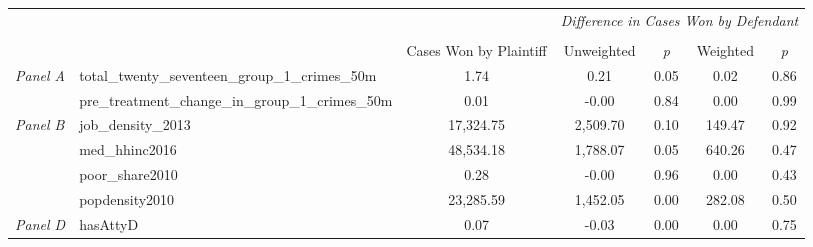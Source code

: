 \begin{tabular}{llccccc}
\toprule
 &  & \textit{} & \multicolumn{4}{c}{\textit{Difference in Cases Won by Defendant}} \\
\cline{4-7}
\\
 &  & Cases Won by Plaintiff & Unweighted & \emph{p} & Weighted & \emph{p} \\
\midrule
\multirow[c]{2}{3cm}{\textit{Panel A}} & total_twenty_seventeen_group_1_crimes_50m & 1.74 & 0.21 & 0.05 & 0.02 & 0.86 \\
 & pre_treatment_change_in_group_1_crimes_50m & 0.01 & -0.00 & 0.84 & 0.00 & 0.99 \\
\cline{1-7}
\multirow[c]{4}{3cm}{\textit{Panel B}} & job_density_2013 & 17,324.75 & 2,509.70 & 0.10 & 149.47 & 0.92 \\
 & med_hhinc2016 & 48,534.18 & 1,788.07 & 0.05 & 640.26 & 0.47 \\
 & poor_share2010 & 0.28 & -0.00 & 0.96 & 0.00 & 0.43 \\
 & popdensity2010 & 23,285.59 & 1,452.05 & 0.00 & 282.08 & 0.50 \\
\cline{1-7}
\textit{Panel D} & hasAttyD & 0.07 & -0.03 & 0.00 & 0.00 & 0.75 \\
\cline{1-7}
\bottomrule
\end{tabular}
